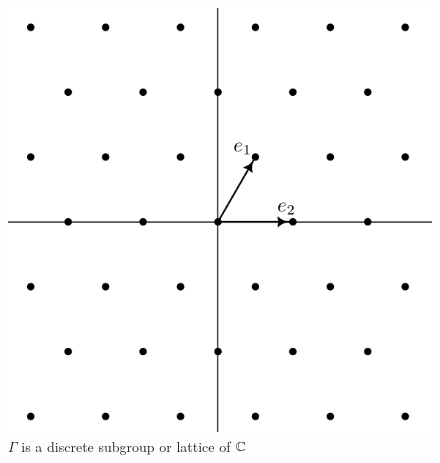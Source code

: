 \begin{figure}[ht]
    \centering
    \includegraphics{Images/lattice_in_cmplx_plane.png}
    \caption{$\Gamma$ is a discrete subgroup or lattice of $\mathbb{C}$}
    \label{fig:lattice-in-cmplx-plane}
\end{figure}


